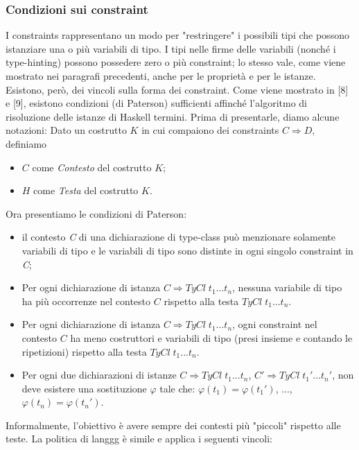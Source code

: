 \documentclass[10pt,a4paper]{article}
\begin{document}
\subsubsection{Condizioni sui constraint}
I constraints rappresentano un modo per "restringere" i possibili tipi che possono istanziare una o più variabili di
tipo. I tipi nelle firme delle variabili (nonché i type-hinting) possono possedere zero o più constraint; lo stesso
vale, come viene mostrato nei paragrafi precedenti, anche per le proprietà e per le istanze. Esistono, però, dei
vincoli sulla forma dei constraint. Come viene mostrato in [8] e [9], esistono condizioni (di Paterson) sufficienti
affinché l'algoritmo di risoluzione delle istanze di Haskell termini. Prima di presentarle, diamo alcune notazioni:
\newline Dato un costrutto $ K $ in cui compaiono dei constraints $ C \Rightarrow D $, definiamo
\begin{itemize}
    \item $ C $ come \textit{Contesto} del costrutto $ K $;
    \item $ H $ come \textit{Testa} del costrutto $ K $.
\end{itemize}
Ora presentiamo le condizioni di Paterson:
\begin{itemize}
    \item il contesto \textit{C} di una dichiarazione di type-class può menzionare solamente variabili di tipo e
    le variabili di tipo sono distinte in ogni singolo constraint in \textit{C};
    \item Per ogni dichiarazione di istanza $ C \Rightarrow TyCl \; t_1 ... t_n $, nessuna variabile di tipo ha
    più occorrenze nel contesto $ C $ rispetto alla testa $ TyCl \; t_1 ... t_n $.
    \item Per ogni dichiarazione di istanza $ C \Rightarrow TyCl \; t_1 ... t_n $, ogni constraint nel contesto
    $ C $ ha meno costruttori e variabili di tipo (presi insieme e contando le ripetizioni) rispetto alla testa
    $ TyCl \; t_1 ... t_n $.
    \item Per ogni due dichiarazioni di istanze $ C \Rightarrow TyCl \; t_1 ... t_n $,
    $ C' \Rightarrow TyCl \; t_1' ... t_n' $, non deve esistere una sostituzione $ \varphi $ tale che:
    $ \varphi(t_1) = \varphi(t_1') $, ..., $ \varphi(t_n) = \varphi(t_n') $.
\end{itemize}
Informalmente, l'obiettivo è avere sempre dei contesti più "piccoli" rispetto alle teste. La politica di langgg è
simile e applica i seguenti vincoli:
\end{document}
